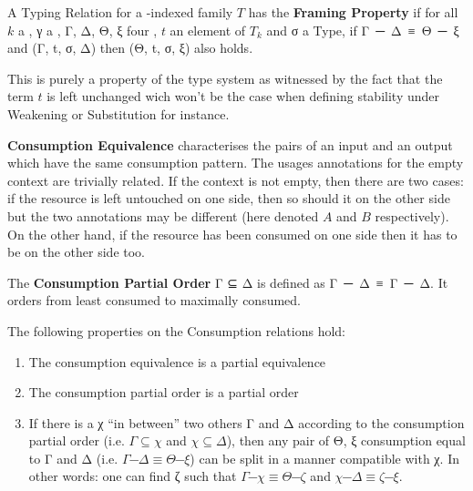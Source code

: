 \documentclass[a4paper,UKenglish]{lipics-v2016}
\begin{document}
\begin{definition}A Typing Relation \TR{\cdot{}} for a \Nat{}-indexed
family $T$ has the \textbf{Framing Property} if for all $k$ a \Nat{},
γ a , Γ, Δ, Θ, ξ four , $t$ an element
of $T_k$ and σ a Type, if \mbox{Γ ─ Δ ≡ Θ ─ ξ} and (Γ, t, σ, Δ)
then (Θ, t, σ, ξ) also holds.
\end{definition}

\begin{remark}This is purely a property of the type system as
witnessed by the fact that the term $t$ is left unchanged wich
won't be the case when defining stability under Weakening or
Substitution for instance.
\end{remark}


\begin{definition}
\label{definition:differences}
\textbf{Consumption Equivalence} characterises the pairs of an input and
an output \Usages{} which have the same consumption pattern. The
usages annotations for the empty context are trivially related.
If the context is not empty, then there are two cases: if the
resource is left untouched on one side, then so should it on the other
side but the two annotations may be different (here denoted $A$ and $B$
respectively). On the other hand, if the resource has been consumed
on one side then it has to be on the other side too.
\end{definition}

\begin{definition}The \textbf{Consumption Partial Order} Γ ⊆ Δ is defined as
\mbox{Γ ─ Δ ≡ Γ ─ Δ}. It orders \Usages{} from least consumed to maximally consumed.
\end{definition}

\begin{lemma} The following properties on the Consumption relations hold:
\begin{enumerate}
  \item The consumption equivalence is a partial equivalence~\cite{mitchell1996foundations}
  \item The consumption partial order is a partial order
  \item If there is a \Usages{} χ ``in between'' two others Γ and Δ according to
        the consumption partial order (i.e. $Γ ⊆ χ$ and $χ ⊆ Δ$), then any pair
        of \Usages{} Θ, ξ consumption equal to Γ and Δ (i.e. \mbox{$Γ ─ Δ ≡ Θ ─ ξ$})
        can be split in a manner compatible with χ. In other words: one can find
        ζ such that \mbox{$Γ ─ χ ≡ Θ ─ ζ$} and \mbox{$χ ─ Δ ≡ ζ ─ ξ$}.
\end{enumerate}
\end{lemma}
\end{document}
